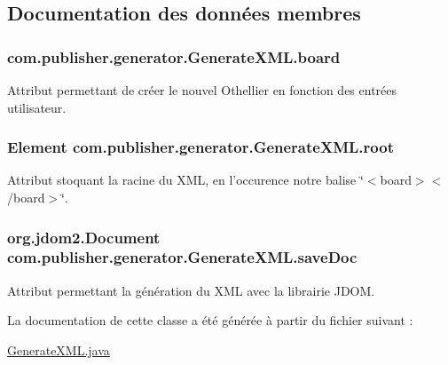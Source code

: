 \subsection{Documentation des données membres}
\hypertarget{classcom_1_1publisher_1_1generator_1_1GenerateXML_afd9f81fe09deb4a51d4ddab0e52e5de9}{
\subsubsection[{board}]{ com.\-publisher.\-generator.\-Generate\-X\-M\-L.\-board\hspace{0.3cm}{\ttfamily [private]}}}\label{classcom_1_1publisher_1_1generator_1_1GenerateXML_afd9f81fe09deb4a51d4ddab0e52e5de9}
Attribut permettant de créer le nouvel Othellier en fonction des entrées utilisateur. \hypertarget{classcom_1_1publisher_1_1generator_1_1GenerateXML_a700b8738d323998d4edcc17903ab1730}{
\subsubsection[{root}]{\setlength{\rightskip}{0pt plus 5cm}Element com.\-publisher.\-generator.\-Generate\-X\-M\-L.\-root\hspace{0.3cm}{\ttfamily [private]}}}\label{classcom_1_1publisher_1_1generator_1_1GenerateXML_a700b8738d323998d4edcc17903ab1730}
Attribut stoquant la racine du X\-M\-L, en l'occurence notre balise \char`\"{}$<$board$>$$<$/board$>$\char`\"{}. \hypertarget{classcom_1_1publisher_1_1generator_1_1GenerateXML_a3eff314e550f7477f25d1c1624719f21}{
\subsubsection[{save\-Doc}]{\setlength{\rightskip}{0pt plus 5cm}org.\-jdom2.\-Document com.\-publisher.\-generator.\-Generate\-X\-M\-L.\-save\-Doc\hspace{0.3cm}{\ttfamily [private]}}}\label{classcom_1_1publisher_1_1generator_1_1GenerateXML_a3eff314e550f7477f25d1c1624719f21}
Attribut permettant la génération du X\-M\-L avec la librairie J\-D\-O\-M. 

La documentation de cette classe a été générée à partir du fichier suivant \-:\begin{DoxyCompactItemize}
\item 
\hyperlink{GenerateXML_8java}{Generate\-X\-M\-L.\-java}\end{DoxyCompactItemize}
